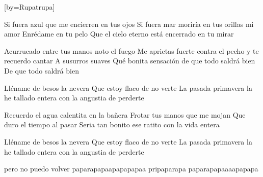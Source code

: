 
[by={Rupatrupa}]
    

    \beginverse
        Si fuera azul que me encierren en tus ojos
        Si fuera mar moriría en tus orillas mi amor
        Enrédame en tu pelo
        Que el cielo eterno está encerrado en tu mirar
    \endverse

    \beginverse    
        Acurrucado entre tus manos noto el fuego
        Me aprietas fuerte contra el pecho y te recuerdo cantar
        A susurros suaves
        Qué bonita sensación de que todo saldrá bien
        De que todo saldrá bien
    \endverse

    \beginverse
        Lléname de besos la nevera
        Que estoy flaco de no verte
        La pasada primavera la he tallado entera con la angustia de perderte
    \endverse

    \beginverse
        Recuerdo el agua calentita en la bañera
        Frotar tus manos que me mojan
        Que duro el tiempo al pasar
        Seria tan bonito ese ratito con la vida entera
    \endverse

    \beginverse
        Lléname de besos la nevera
        Que estoy flaco de no verte
        La pasada primavera la he tallado entera con la angustia de perderte
    \endverse

    \beginverse
        pero no puedo volver
        paparapapaapapapapaa
        pripaparapa
        paparapapaaaapapapa
    \endverse

\endsong

\scleardpage